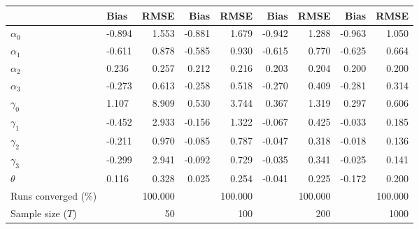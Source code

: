 
\begin{tabular}[t]{llrrrrrrr}
\toprule
  & Bias & RMSE & Bias & RMSE & Bias & RMSE & Bias & RMSE\\
\midrule
$\alpha_{0}$ & -0.894 & 1.553 & -0.881 & 1.679 & -0.942 & 1.288 & -0.963 & 1.050\\
$\alpha_{1}$ & -0.611 & 0.878 & -0.585 & 0.930 & -0.615 & 0.770 & -0.625 & 0.664\\
$\alpha_{2}$ & 0.236 & 0.257 & 0.212 & 0.216 & 0.203 & 0.204 & 0.200 & 0.200\\
$\alpha_{3}$ & -0.273 & 0.613 & -0.258 & 0.518 & -0.270 & 0.409 & -0.281 & 0.314\\
$\gamma_{0}$ & 1.107 & 8.909 & 0.530 & 3.744 & 0.367 & 1.319 & 0.297 & 0.606\\
$\gamma_{1}$ & -0.452 & 2.933 & -0.156 & 1.322 & -0.067 & 0.425 & -0.033 & 0.185\\
$\gamma_{2}$ & -0.211 & 0.970 & -0.085 & 0.787 & -0.047 & 0.318 & -0.018 & 0.136\\
$\gamma_{3}$ & -0.299 & 2.941 & -0.092 & 0.729 & -0.035 & 0.341 & -0.025 & 0.141\\
$\theta$ & 0.116 & 0.328 & 0.025 & 0.254 & -0.041 & 0.225 & -0.172 & 0.200\\
Runs converged (\%) &  & 100.000 &  & 100.000 &  & 100.000 &  & 100.000\\
Sample size ($T$) &  & 50 &  & 100 &  & 200 &  & 1000\\
\bottomrule
\end{tabular}
